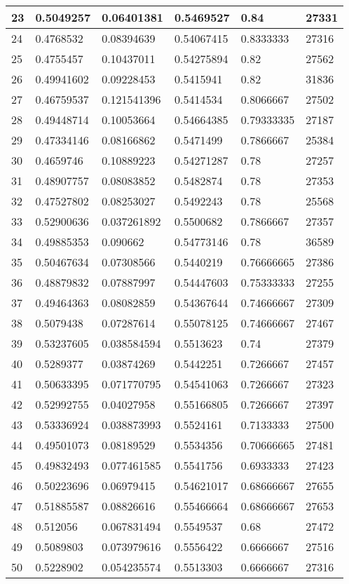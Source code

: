 \begin{longtable}{|l|l|l|l|l|l|}
23 & 0.5049257 & 0.06401381 & 0.5469527 & 0.84 & 27331 \\ \hline 
24 & 0.4768532 & 0.08394639 & 0.54067415 & 0.8333333 & 27316 \\ \hline 
25 & 0.4755457 & 0.10437011 & 0.54275894 & 0.82 & 27562 \\ \hline 
26 & 0.49941602 & 0.09228453 & 0.5415941 & 0.82 & 31836 \\ \hline 
27 & 0.46759537 & 0.121541396 & 0.5414534 & 0.8066667 & 27502 \\ \hline 
28 & 0.49448714 & 0.10053664 & 0.54664385 & 0.79333335 & 27187 \\ \hline 
29 & 0.47334146 & 0.08166862 & 0.5471499 & 0.7866667 & 25384 \\ \hline 
30 & 0.4659746 & 0.10889223 & 0.54271287 & 0.78 & 27257 \\ \hline 
31 & 0.48907757 & 0.08083852 & 0.5482874 & 0.78 & 27353 \\ \hline 
32 & 0.47527802 & 0.08253027 & 0.5492243 & 0.78 & 25568 \\ \hline 
33 & 0.52900636 & 0.037261892 & 0.5500682 & 0.7866667 & 27357 \\ \hline 
34 & 0.49885353 & 0.090662 & 0.54773146 & 0.78 & 36589 \\ \hline 
35 & 0.50467634 & 0.07308566 & 0.5440219 & 0.76666665 & 27386 \\ \hline 
36 & 0.48879832 & 0.07887997 & 0.54447603 & 0.75333333 & 27255 \\ \hline 
37 & 0.49464363 & 0.08082859 & 0.54367644 & 0.74666667 & 27309 \\ \hline 
38 & 0.5079438 & 0.07287614 & 0.55078125 & 0.74666667 & 27467 \\ \hline 
39 & 0.53237605 & 0.038584594 & 0.5513623 & 0.74 & 27379 \\ \hline 
40 & 0.5289377 & 0.03874269 & 0.5442251 & 0.7266667 & 27457 \\ \hline 
41 & 0.50633395 & 0.071770795 & 0.54541063 & 0.7266667 & 27323 \\ \hline 
42 & 0.52992755 & 0.04027958 & 0.55166805 & 0.7266667 & 27397 \\ \hline 
43 & 0.53336924 & 0.038873993 & 0.5524161 & 0.7133333 & 27500 \\ \hline 
44 & 0.49501073 & 0.08189529 & 0.5534356 & 0.70666665 & 27481 \\ \hline 
45 & 0.49832493 & 0.077461585 & 0.5541756 & 0.6933333 & 27423 \\ \hline 
46 & 0.50223696 & 0.06979415 & 0.54621017 & 0.68666667 & 27655 \\ \hline 
47 & 0.51885587 & 0.08826616 & 0.55466664 & 0.68666667 & 27653 \\ \hline 
48 & 0.512056 & 0.067831494 & 0.5549537 & 0.68 & 27472 \\ \hline 
49 & 0.5089803 & 0.073979616 & 0.5556422 & 0.6666667 & 27516 \\ \hline 
50 & 0.5228902 & 0.054235574 & 0.5513303 & 0.6666667 & 27316 \\ \hline 
\end{longtable}